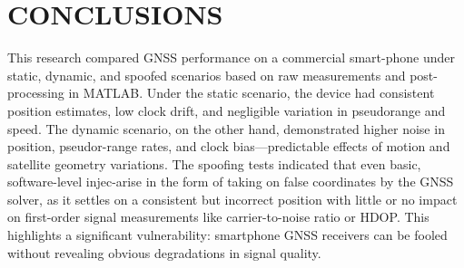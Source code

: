 
\section{CONCLUSIONS} \label{sec:conclusions}

    This research compared GNSS performance on a commercial smart-phone under static, dynamic, and spoofed scenarios based on raw measurements and post-processing in MATLAB. Under the static scenario, the device had consistent position estimates, low clock drift, and negligible variation in pseudorange and speed. The dynamic scenario, on the other hand, demonstrated higher noise in position, pseudor-range rates, and clock bias—predictable effects of motion and satellite geometry variations.
    The spoofing tests indicated that even basic, software-level injec-arise in the form of taking on false coordinates by the GNSS solver, as it settles on a consistent but incorrect position with little or no impact on first-order signal measurements like carrier-to-noise ratio or HDOP. This highlights a significant vulnerability: smartphone GNSS receivers can be fooled without revealing obvious degradations in signal quality.